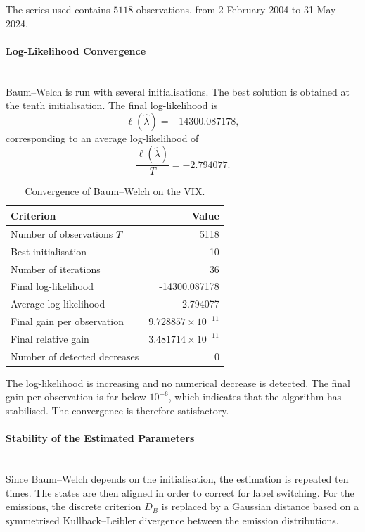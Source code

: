 \documentclass[11pt]{article}
\begin{document}
The series used contains \(5118\) observations, from 2 February 2004 to 31 May 2024.

\paragraph{Log-Likelihood Convergence}\mbox{}\\

Baum--Welch is run with several initialisations. The best solution is obtained at the tenth initialisation. The final log-likelihood is
\[
\ell(\widehat{\lambda})=-14300.087178,
\]
corresponding to an average log-likelihood of
\[
\frac{\ell(\widehat{\lambda})}{T}=-2.794077.
\]

\begin{table}[H]
\centering
\begin{tabular}{lr}
\toprule
Criterion & Value \\
\midrule
Number of observations \(T\) & 5118 \\
Best initialisation & 10 \\
Number of iterations & 36 \\
Final log-likelihood & -14300.087178 \\
Average log-likelihood & -2.794077 \\
Final gain per observation & \(9.728857\times 10^{-11}\) \\
Final relative gain & \(3.481714\times 10^{-11}\) \\
Number of detected decreases & 0 \\
\bottomrule
\end{tabular}
\caption{Convergence of Baum--Welch on the VIX.}
\end{table}

The log-likelihood is increasing and no numerical decrease is detected. The final gain per observation is far below \(10^{-6}\), which indicates that the algorithm has stabilised. The convergence is therefore satisfactory.

\paragraph{Stability of the Estimated Parameters}\mbox{}\\

Since Baum--Welch depends on the initialisation, the estimation is repeated ten times. The states are then aligned in order to correct for label switching. For the emissions, the discrete criterion \(D_B\) is replaced by a Gaussian distance based on a symmetrised Kullback--Leibler divergence between the emission distributions.
\end{document}
